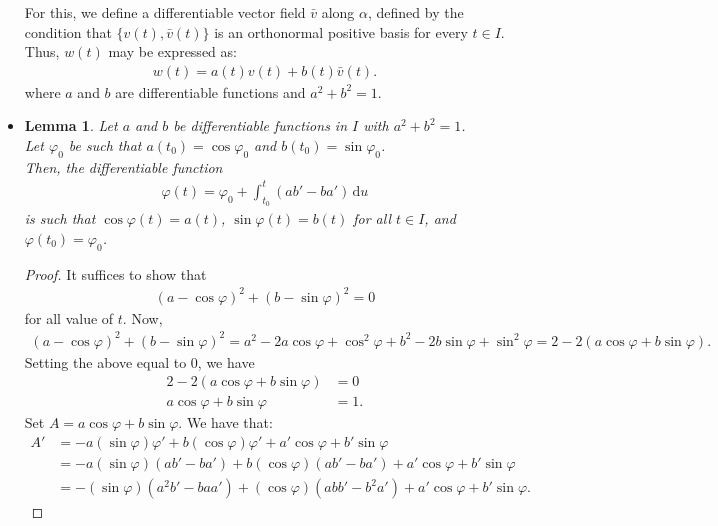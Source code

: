\documentclass[10pt]{article}
\newtheorem{lemma}{Lemma}[section]
\newcommand{\dee}{\mathrm{d}}
\begin{document}
\begin{itemize}
    For this, we define a differentiable vector field $\bar v$ along $\alpha$, defined by the condition that $\{ v(t), \bar v(t) \}$ is an orthonormal positive basis for every $t \in I$. Thus, $w(t)$ may be expressed as:
    \begin{align*}
      w(t) = a(t) v(t) + b(t) \bar v(t).
    \end{align*}
    where $a$ and $b$ are differentiable functions and $a^2 + b^2 = 1$.

    \item \begin{lemma}
      Let $a$ and $b$ be differentiable functions in $I$ with $a^2 + b^2 = 1$.\\
      Let $\varphi_0$ be such that $a(t_0) = \cos \varphi_0$ and $b(t_0) = \sin \varphi_0$.\\
      Then, the differentiable function
      \begin{align*}
        \varphi(t) = \varphi_0 + \int_{t_0}^t (ab' - ba')\, \dee u
      \end{align*}
      is such that $\cos \varphi(t) = a(t)$, $\sin \varphi(t) = b(t)$ for all $t \in I$, and $\varphi(t_0) = \varphi_0$.
    \end{lemma}
    \begin{proof}
      It suffices to show that
      \begin{align*}
        (a - \cos\varphi)^2 + (b - \sin\varphi)^2 = 0
      \end{align*}
      for all value of $t$. Now,
      \begin{align*}
        (a - \cos\varphi)^2 + (b - \sin\varphi)^2 = a^2 - 2a \cos \varphi + \cos^2 \varphi + b^2 -2b\sin \varphi + \sin^2 \varphi = 2 - 2(a \cos \varphi + b\sin\varphi).
      \end{align*}
      Setting the above equal to 0, we have
      \begin{align*}
        2 - 2(a \cos \varphi + b\sin\varphi) &= 0\\
        a \cos \varphi + b \sin\varphi &= 1.
      \end{align*}
      Set $A = a \cos\varphi + b \sin\varphi$. We have that:
      \begin{align*}
        A' 
        &= -a (\sin\varphi ) \varphi' + b (\cos \varphi) \varphi' + a' \cos \varphi + b' \sin\varphi\\
        &= -a (\sin\varphi ) (ab' - ba') + b (\cos \varphi) (ab' - ba') + a' \cos \varphi + b' \sin\varphi\\
        &= -(\sin\varphi ) (a^2b' - baa') + (\cos \varphi) (abb' - b^2a') + a' \cos \varphi + b' \sin\varphi.

\end{align*}
\end{proof}
\end{itemize}
\end{document}
